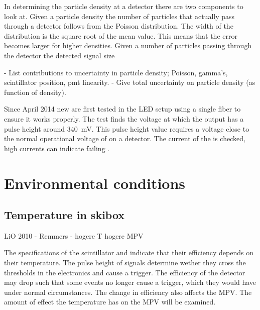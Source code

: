 In determining the particle density at a detector there are two components to look at. Given a particle density the number of particles that actually pass through a detector follows from the Poisson distribution. The width of the distribution is the square root of the mean value. This means that the error becomes larger for higher densities. Given a number of particles passing through the detector the detected signal size

- List contributions to uncertainty in particle density; Poisson, gamma's, scintillator position, pmt linearity.
- Give total uncertainty on particle density (as function of density).

Since April 2014 new \pmts are first tested in the LED setup using a single fiber to ensure it works properly. The test finds the voltage at which the output has a pulse height around \SI{340}{\milli\volt}. This pulse height value requires a voltage close to the normal operational voltage of \pmts on a \hisparc detector. The current of the \pmt is checked, high currents can indicate failing \pmts.


\section{Environmental conditions}
\label{sec:detector-environmental}

\subsection{Temperature in skibox}

LiO 2010 - Remmers - hogere T hogere MPV

The specifications of the scintillator and \pmt indicate that their efficiency depends on their temperature. The pulse height of signals determine wether they cross the thresholds in the electronics and cause a trigger. The efficiency of the detector may drop such that some events no longer cause a trigger, which they would have under normal circumstances. The change in efficiency also affects the MPV. The amount of effect the temperature has on the MPV will be examined.

